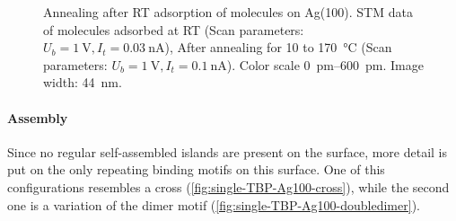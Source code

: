 	\begin{figure}[] \centering
		\caption{Annealing after RT adsorption of molecules on Ag(100).  STM data of molecules adsorbed at RT (Scan parameters: $U_b=\SI{1}{\volt}, I_t=\SI{0,03}{\nano \ampere}$),  After annealing for \SI{10}{\min} to \SI{170}{\celsius} (Scan parameters: $U_b=\SI{1}{\volt}, I_t=\SI{0,1}{\nano \ampere}$). Color scale \SIrange{0}{600}{\pico\meter}. Image width: \SI{44}{\nm}.}
		\label{fig:single-TBP-Ag100-annealing}
	\end{figure}
	
	\paragraph{Assembly}
	Since no regular self-assembled islands are present on the surface, more detail is put on the only repeating binding motifs on this surface. One of this configurations resembles a cross (\autoref{fig:single-TBP-Ag100-cross}), while the second one is a variation of the dimer motif (\autoref{fig:single-TBP-Ag100-doubledimer}).
	

